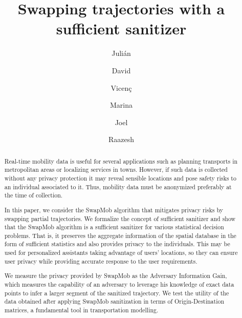 \documentclass[times,twocolumn,final,authoryear]{elsarticle}
\begin{document}
\begin{frontmatter}

\title{Swapping trajectories with a sufficient sanitizer}


\author[1,2]{Juli\'an } 

\author[1,2]{David }
\author[3,4]{Vicen\c{c}  }
\author[5]{Marina  }
\author[6]{Joel  }
\author[6,7]{Raazesh  }

\address[1]{Internet Interdisciplinary Institute (IN3), Universitat Oberta de Catalunya (UOC), Barcelona, Spain.
}
\address[2]{CYBERCAT-Center for Cybersecurity Research 
of Catalonia, Barcelona, Spain.}
\address[3]{Hamilton Institute, Maynooth University, Maynooth, Ireland.}
\address[4]{School of Informatics, University of Sk\"{o}vde, Sk\"{o}vde, Sweden.}
\address[5]{Department of Economic and Cultural Geography, Uppsala University, Uppsala, Sweden.}
\address[6]{Department of Mathematics, Uppsala University, Uppsala, Sweden.}
\address[7]{Combient Competence Centre for Data Engineering Sciences, Uppsala University, Sweden.}

\begin{abstract}

Real-time mobility data is useful for several applications such as planning transports in metropolitan areas or localizing services in towns. However, if such data is collected without any privacy protection it may reveal sensible locations and pose safety risks to an individual associated to it.
Thus, mobility data must be anonymized preferably at the time of collection.

In this paper, we consider the SwapMob algorithm that mitigates privacy risks by swapping partial trajectories. We formalize the concept of sufficient sanitizer and show that the SwapMob algorithm is a sufficient sanitizer for various statistical decision problems. That is, it preserves the aggregate information of the spatial database in the form of sufficient statistics and also provides privacy to the individuals. 
This may be used for personalized assistants taking advantage of users' locations, so they can ensure user privacy while providing accurate response to the user requirements.

We measure the privacy provided by SwapMob as the Adversary Information Gain, which measures the capability of an adversary to leverage his knowledge of exact data points to infer a larger segment of the sanitized trajectory. 
We test the utility of the data obtained after applying SwapMob sanitization in terms of Origin-Destination matrices, a fundamental tool in  transportation modelling.



\end{abstract}
\end{frontmatter}
\end{document}

